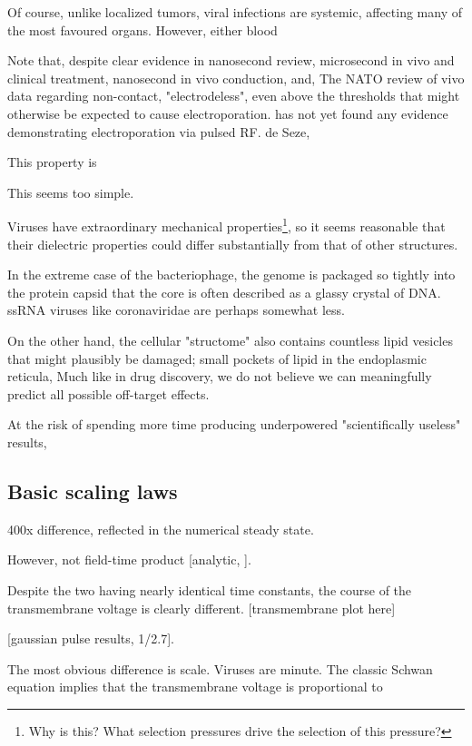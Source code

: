 \documentclass[fleqn,10pt]{paper}
\begin{document}
Of course, unlike localized tumors, viral infections are systemic, affecting many of the most favoured organs. However, either blood 



Note that, despite clear evidence in nanosecond review, microsecond in vivo and clinical treatment, nanosecond in vivo conduction, and, The NATO review of vivo data regarding non-contact, "electrodeless", even above the thresholds that might otherwise be expected to cause electroporation. has not yet found any evidence demonstrating electroporation via pulsed RF. de Seze, 

This property is 
\cite{Nanosecond2006b} 



This seems too simple.

Viruses have extraordinary mechanical properties\footnote{Why is this? What selection pressures drive the selection of this pressure?}, so it seems reasonable that their dielectric properties could differ substantially from that of other structures. 

In the extreme case of the bacteriophage, the genome is packaged so tightly into the protein capsid that the core is often described as a glassy crystal of DNA\cite{Conformation2007}. ssRNA viruses like coronaviridae are perhaps somewhat less. 

On the other hand, the cellular "structome" also contains countless lipid vesicles that might plausibly be damaged; small pockets of lipid in the endoplasmic reticula, Much like in drug discovery, we do not believe we can meaningfully predict all possible off-target effects.



At the risk of spending more time producing underpowered "scientifically useless" results, 

\subsection*{Basic scaling laws}

400x difference, reflected in the numerical steady state.

However, not field-time product [analytic, ]. 

Despite the two having nearly identical time constants, the course of the transmembrane voltage is clearly different.
[transmembrane plot here]

[gaussian pulse results, 1/2.7]. 

The most obvious difference is scale. Viruses are minute. The classic Schwan equation implies that the transmembrane voltage is proportional to 
\end{document}
